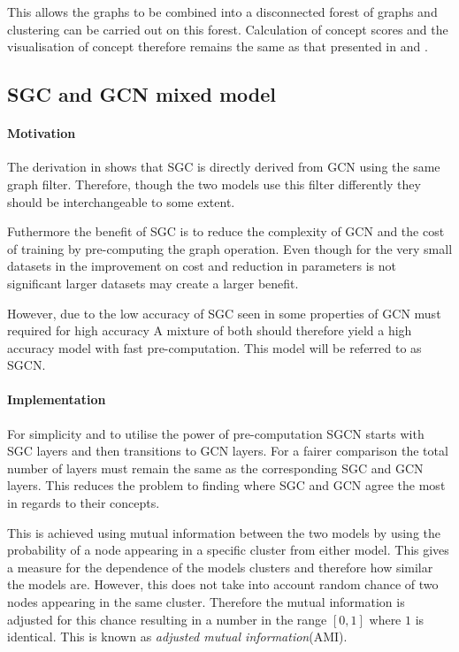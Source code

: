 This allows the graphs to be combined into a disconnected forest of graphs and clustering can be carried out on this forest.
Calculation of concept scores and the visualisation of concept therefore remains the same as that presented in  and .

\subsection{SGC and GCN mixed model}
\paragraph{Motivation}
The derivation in  shows that SGC is directly derived from GCN using the same graph filter.
Therefore, though the two models use this filter differently they should be interchangeable to some extent.

Futhermore the benefit of SGC is to reduce the complexity of GCN and the cost of training by pre-computing the graph operation.
Even though for the very small datasets in  the improvement on cost and reduction in parameters is not significant larger datasets may create a larger benefit.

However, due to the low accuracy of SGC seen in  some properties of GCN must required for high accuracy 
A mixture of both should therefore yield a high accuracy model with fast pre-computation.
This model will be referred to as SGCN.

\paragraph{Implementation}
For simplicity and to utilise the power of pre-computation SGCN starts with SGC layers and then transitions to GCN layers.
For a fairer comparison the total number of layers must remain the same as the corresponding SGC and GCN layers.
This reduces the problem to finding where SGC and GCN agree the most in regards to their concepts.

This is achieved using mutual information between the two models by using the probability of a node appearing in a specific cluster from either model.
This gives a measure for the dependence of the models clusters and therefore how similar the models are.
However, this does not take into account random chance of two nodes appearing in the same cluster.
Therefore the mutual information is adjusted for this chance resulting in a number in the range $[0, 1]$ where $1$ is identical.
This is known as \emph{adjusted mutual information}(AMI).

